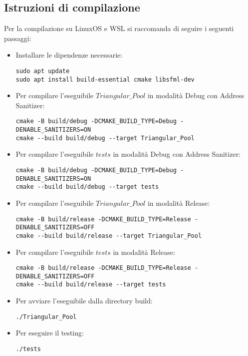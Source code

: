 \documentclass{article}
\begin{document}
\subsection{Istruzioni di compilazione}
Per la compilazione su LinuxOS e WSL si raccomanda di seguire i seguenti passaggi:


\begin{itemize}
    \item Installare le dipendenze necessarie:
    \begin{lstlisting}[style=wsl]
sudo apt update
sudo apt install build-essential cmake libsfml-dev
\end{lstlisting}

\item Per compilare l'eseguibile $Triangular\_Pool$ in modalità Debug con Address Sanitizer:
    \begin{lstlisting}[style=wsl]
cmake -B build/debug -DCMAKE_BUILD_TYPE=Debug -DENABLE_SANITIZERS=ON
cmake --build build/debug --target Triangular_Pool
\end{lstlisting}

\item Per compilare l'eseguibile $tests$ in modalità Debug con Address Sanitizer:
    \begin{lstlisting}[style=wsl]
cmake -B build/debug -DCMAKE_BUILD_TYPE=Debug -DENABLE_SANITIZERS=ON
cmake --build build/debug --target tests
\end{lstlisting}

\item Per compilare l'eseguibile $Triangular\_Pool$ in modalità Release:
    \begin{lstlisting}[style=wsl]
cmake -B build/release -DCMAKE_BUILD_TYPE=Release -DENABLE_SANITIZERS=OFF
cmake --build build/release --target Triangular_Pool
\end{lstlisting}


\item Per compilare l'eseguibile $tests$ in modalità Release:
    \begin{lstlisting}[style=wsl]
cmake -B build/release -DCMAKE_BUILD_TYPE=Release -DENABLE_SANITIZERS=OFF
cmake --build build/release --target tests
\end{lstlisting}




\item Per avviare l'eseguibile dalla directory build:
    \begin{lstlisting}[style=wsl]
./Triangular_Pool
\end{lstlisting}

\item Per eseguire il testing:
    \begin{lstlisting}[style=wsl]
./tests
\end{lstlisting}

\end{itemize}
\end{document}
